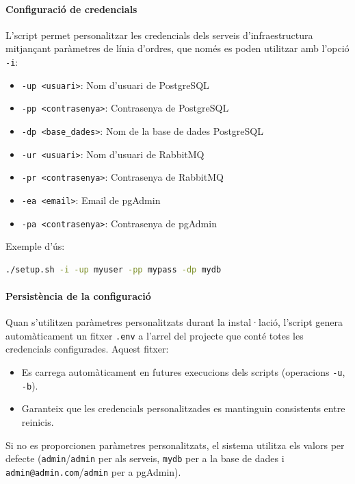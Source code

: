 \paragraph{Configuració de credencials}

L'script permet personalitzar les credencials dels serveis d'infraestructura mitjançant paràmetres de línia d'ordres, que només es poden utilitzar amb l'opció \texttt{-i}:

\begin{itemize}
  \item \texttt{-up <usuari>}: Nom d'usuari de PostgreSQL
  \item \texttt{-pp <contrasenya>}: Contrasenya de PostgreSQL
  \item \texttt{-dp <base\_dades>}: Nom de la base de dades PostgreSQL
  \item \texttt{-ur <usuari>}: Nom d'usuari de RabbitMQ
  \item \texttt{-pr <contrasenya>}: Contrasenya de RabbitMQ
  \item \texttt{-ea <email>}: Email de pgAdmin
  \item \texttt{-pa <contrasenya>}: Contrasenya de pgAdmin
\end{itemize}

Exemple d'ús:
\begin{lstlisting}[language=bash]
./setup.sh -i -up myuser -pp mypass -dp mydb
\end{lstlisting}

\paragraph{Persistència de la configuració}

Quan s'utilitzen paràmetres personalitzats durant la instal·lació, l'script genera automàticament un fitxer \texttt{.env} a l'arrel del projecte que conté totes les credencials configurades. Aquest fitxer:

\begin{itemize}
  \item Es carrega automàticament en futures execucions dels scripts (operacions \texttt{-u}, \texttt{-b}).
  \item Garanteix que les credencials personalitzades es mantinguin consistents entre reinicis.
\end{itemize}

Si no es proporcionen paràmetres personalitzats, el sistema utilitza els valors per defecte (\texttt{admin}/\texttt{admin} per als serveis, \texttt{mydb} per a la base de dades i \texttt{admin@admin.com}/\texttt{admin} per a pgAdmin).

